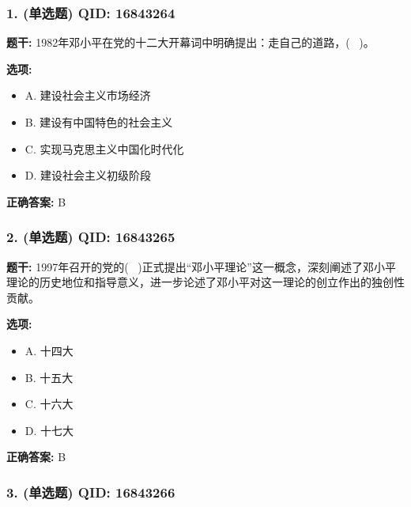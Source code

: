 \documentclass[12pt,UTF8]{ctexart}
\begin{document}
\subsubsection*{1. (单选题) \small QID: 16843264}

\textbf{题干:}
1982年邓小平在党的十二大开幕词中明确提出：走自己的道路，(  )。

\textbf{选项:}
\begin{itemize}[leftmargin=*]

  \item A. 建设社会主义市场经济

  \item B. 建设有中国特色的社会主义

  \item C. 实现马克思主义中国化时代化

  \item D. 建设社会主义初级阶段

\end{itemize}

\textbf{正确答案:}
B

\vspace{0.3em}\hrulefill\vspace{0.7em}

\subsubsection*{2. (单选题) \small QID: 16843265}

\textbf{题干:}
1997年召开的党的(  )正式提出“邓小平理论”这一概念，深刻阐述了邓小平理论的历史地位和指导意义，进一步论述了邓小平对这一理论的创立作出的独创性贡献。

\textbf{选项:}
\begin{itemize}[leftmargin=*]

  \item A. 十四大

  \item B. 十五大

  \item C. 十六大

  \item D. 十七大

\end{itemize}

\textbf{正确答案:}
B

\vspace{0.3em}\hrulefill\vspace{0.7em}

\subsubsection*{3. (单选题) \small QID: 16843266}
\end{document}
